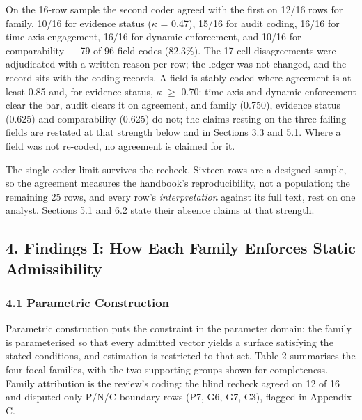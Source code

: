 \documentclass[11pt]{article}
\begin{document}
On the 16-row sample the second coder agreed with the first on 12/16 rows for family, 10/16 for evidence status ($\kappa$ = 0.47), 15/16 for audit coding, 16/16 for time-axis engagement, 16/16 for dynamic enforcement, and 10/16 for comparability — 79 of 96 field codes (82.3\%). The 17 cell disagreements were adjudicated with a written reason per row; the ledger was not changed, and the record sits with the coding records. A field is stably coded where agreement is at least 0.85 and, for evidence status, $\kappa$ $\geq$ 0.70: time-axis and dynamic enforcement clear the bar, audit clears it on agreement, and family (0.750), evidence status (0.625) and comparability (0.625) do not; the claims resting on the three failing fields are restated at that strength below and in Sections 3.3 and 5.1. Where a field was not re-coded, no agreement is claimed for it.

The single-coder limit survives the recheck. Sixteen rows are a designed sample, so the agreement measures the handbook's reproducibility, not a population; the remaining 25 rows, and every row's \textit{interpretation} against its full text, rest on one analyst. Sections 5.1 and 6.2 state their absence claims at that strength.

\subsection*{4. Findings I: How Each Family Enforces Static Admissibility}
\subsubsection*{4.1 Parametric Construction}
Parametric construction puts the constraint in the parameter domain: the family is parameterised so that every admitted vector yields a surface satisfying the stated conditions, and estimation is restricted to that set. Table 2 summarises the four focal families, with the two supporting groups shown for completeness. Family attribution is the review's coding: the blind recheck agreed on 12 of 16 and disputed only P/N/C boundary rows (P7, G6, G7, C3), flagged in Appendix C.
\end{document}
